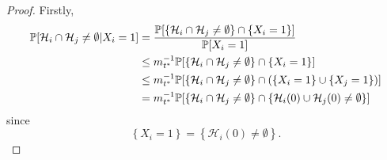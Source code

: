 	\begin{proof}
		Firstly,
		\begin{align}
			\mathbb{P}[\mathcal{H}_i \cap \mathcal{H}_j \neq \emptyset | X_i = 1] &= \frac{\mathbb{P}[\left\{\mathcal{H}_i \cap \mathcal{H}_j \neq \emptyset\right\} \cap \{X_i = 1\}]}{\mathbb{P}[X_i = 1]}\\
			&\leq m_{t^*}^{-1} \mathbb{P}[\left\{\mathcal{H}_i \cap \mathcal{H}_j \neq \emptyset\right\} \cap \{X_i = 1\}]\\
			&\leq  m_{t^*}^{-1} \mathbb{P}[\left\{\mathcal{H}_i \cap \mathcal{H}_j \neq \emptyset\right\} \cap \left(\{X_i = 1\} \cup \{X_j = 1\}\right)]\\
			&= m_{t^*}^{-1} \mathbb{P}[\left\{\mathcal{H}_i \cap \mathcal{H}_j \neq \emptyset\right\} \cap \left\{\mathcal{H}_i(0) \cup \mathcal{H}_j(0) \neq \emptyset\right\}]
			\label{eq:prob in red star}
		\end{align}
		since
		\begin{equation}
			\left\{X_i = 1\right\} = \left\{\mathcal{H}_i(0) \neq \emptyset\right\}.
		\end{equation}

\end{proof}

